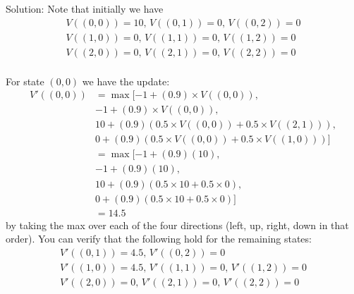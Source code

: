 \documentclass[12pt]{article}
\begin{document}
\vspace{.5pc}

\noindent {}

\vspace{.5pc}


\begin{solution}
\noindent Solution: Note that initially we have
\begin{align*}
    V((0,0)) = 10, \, V((0,1)) = 0, \, V((0,2)) = 0 \\
    V((1,0)) = 0, \, V((1,1)) = 0, \, V((1,2)) = 0 \\
    V((2,0)) = 0, \, V((2,1)) = 0, \, V((2,2)) = 0 \\
\end{align*}

For state $(0,0)$ we have the update:
\begin{align*}
    V'((0,0)) &= \max [-1 + (0.9) \times V((0,0)) ,\\
            &            -1 + (0.9) \times V((0,0)) , \\
            &            10 + (0.9) (0.5 \times V((0,0)) + 0.5 \times V((2,1))) , \\
            &            0 + (0.9) (0.5 \times V((0,0)) + 0.5 \times V((1,0))) ] \\
            &= \max [-1 + (0.9)(10), \\
            &-1 + (0.9)(10), \\
            &10 + (0.9)(0.5 \times 10 + 0.5 \times 0), \\
            &0 + (0.9)(0.5 \times 10 + 0.5 \times 0)] \\
            &= 14.5
\end{align*}
by taking the max over each of the four directions (left, up, right, down in that order). You can verify that the following hold for the remaining states:
\begin{align*}
    V'((0,1)) = 4.5, \, V'((0,2)) = 0 \\
    V'((1,0)) = 4.5, \, V'((1,1)) = 0, \, V'((1,2)) = 0 \\
    V'((2,0)) = 0, \, V'((2,1)) = 0, \, V'((2,2)) = 0
\end{align*}
\end{solution}
\vspace{10cm}

\vspace{.5pc}
\end{document}
